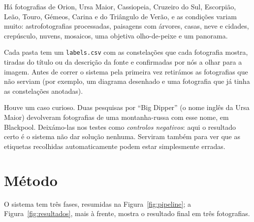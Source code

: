 \documentclass[11pt,a4paper]{article}
\begin{document}
Há fotografias de Orion, Ursa Maior, Cassiopeia, Cruzeiro do Sul, Escorpião,
Leão, Touro, Gémeos, Carina e do Triângulo de Verão, e as condições variam
muito: astrofotografias processadas, paisagens com árvores, casas, neve e
cidades, crepúsculo, nuvens, mosaicos, uma objetiva olho-de-peixe e um
panorama.

Cada pasta tem um \texttt{labels.csv} com as constelações que cada fotografia
mostra, tiradas do título ou da descrição da fonte e confirmadas por nós a
olhar para a imagem. Antes de correr o sistema pela primeira vez retirámos as
fotografias que não serviam (por exemplo, um diagrama desenhado e uma
fotografia que já tinha as constelações anotadas).

Houve um caso curioso. Duas pesquisas por ``Big Dipper'' (o nome inglês da
Ursa Maior) devolveram fotografias de uma montanha-russa com esse nome, em
Blackpool. Deixámo-las nos testes como \emph{controlos negativos}: aqui o
resultado certo é o sistema não dar solução nenhuma. Serviram também para
ver que as etiquetas recolhidas automaticamente podem estar simplesmente
erradas.

\section{Método}

O sistema tem três fases, resumidas na Figura~\ref{fig:pipeline}; a
Figura~\ref{fig:resultados}, mais à frente, mostra o resultado final em três
fotografias.
\end{document}
